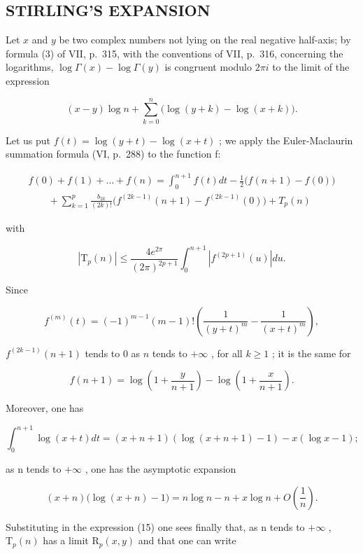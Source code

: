 \subsection{STIRLING'S EXPANSION}

Let \(x\) and \(y\) be two complex numbers not lying on the real negative half-axis; by formula (3) of VII, p.~315, with the conventions of VII, p.~316, concerning the logarithms, \(\log \Gamma(x) - \log \Gamma(y)\) is congruent modulo \(2\pi i\) to the limit of the expression

\[
(x - y) \log n + \sum_ {k = 0} ^ {n} \Big (\log (y + k) - \log (x + k) \Big).\tag{15}
\]

Let us put \(f(t) = \log(y + t) - \log(x + t)\) ; we apply the Euler-Maclaurin summation formula (VI, p.~288) to the function f:

\[
\begin{array}{l} f (0) + f (1) + \dots + f (n) = \int_ {0} ^ {n + 1} f (t) d t - \frac {1}{2} \big (f (n + 1) - f (0) \big) \\ \qquad + \sum_ {k = 1} ^ {p} \frac {b _ {2 k}}{(2 k) !} \big (f ^ {(2 k - 1)} (n + 1) - f ^ {(2 k - 1)} (0) \big) + T _ {p} (n) \end{array}
\]

with

\[
\left| \mathrm{T} _ {p} (n) \right| \leqslant \frac {4 e ^ {2 \pi}}{(2 \pi) ^ {2 p + 1}} \int_ {0} ^ {n + 1} \left| f ^ {(2 p + 1)} (u) \right| d u.\tag{16}
\]

Since

\[
f ^ {(m)} (t) = (- 1) ^ {m - 1} (m - 1)! \left(\frac {1}{(y + t) ^ {m}} - \frac {1}{(x + t) ^ {m}}\right),
\]

\(f^{(2k - 1)}(n + 1)\) tends to 0 as \(n\) tends to \(+\infty\) , for all \(k \geqslant 1\) ; it is the same for

\[
f (n + 1) = \log \left(1 + \frac {y}{n + 1}\right) - \log \left(1 + \frac {x}{n + 1}\right).
\]

Moreover, one has

\[
\int_ {0} ^ {n + 1} \log (x + t) d t = (x + n + 1) (\log (x + n + 1) - 1) - x (\log x - 1);
\]

as n tends to \(+\infty\) , one has the asymptotic expansion

\[
(x + n) \bigl (\log (x + n) - 1 \bigr) = n \log n - n + x \log n + O \left(\frac {1}{n}\right).
\]

Substituting in the expression (15) one sees finally that, as n tends to \(+\infty\) , \(\mathrm{T}_{p}(n)\) has a limit \(\mathrm{R}_{p}(x, y)\) and that one can write

